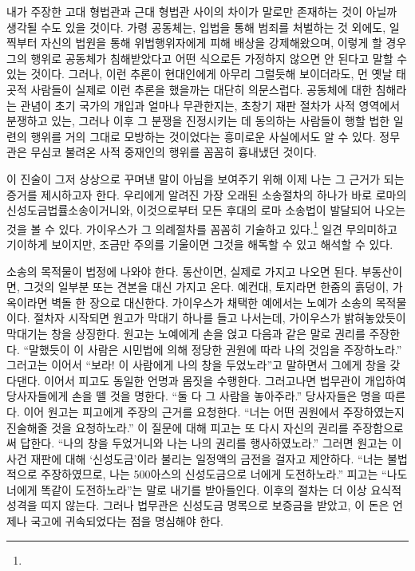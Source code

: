 내가 주장한 고대 형법관과 근대 형법관 사이의 차이가
말로만 존재하는 것이 아닐까 생각될 수도 있을 것이다.
가령 공동체는,
입법을 통해 범죄를 처벌하는 것 외에도,
일찍부터
자신의 법원을 통해
위법행위자에게 피해 배상을
강제해왔으며,
이렇게 할 경우
그의 행위로 공동체가 침해받았다고
어떤 식으로든
가정하지 않으면 안 된다고
말할 수 있는 것이다.
그러나,
이런 추론이
현대인에게
아무리 그럴듯해 보이더라도,
먼 옛날 태곳적 사람들이
실제로
이런 추론을
했을까는 대단히 의문스럽다.
공동체에 대한 침해라는 관념이
초기 국가의 개입과
얼마나 무관한지는,
초창기 재판 절차가
사적 영역에서 분쟁하고 있는,
그러나 이후 그 분쟁을 진정시키는 데 동의하는
사람들이 행할 법한
일련의 행위를 거의 그대로 모방하는 것이었다는
흥미로운 사실에서도
알 수 있다.
정무관은 무심코 불려온 사적 중재인의 행위를 꼼꼼히 흉내냈던 것이다.

이 진술이 그저 상상으로 꾸며낸 말이 아님을 보여주기 위해
이제 나는 그 근거가 되는 증거를 제시하고자 한다.
우리에게 알려진 가장 오래된 소송절차의 하나가
바로 로마의
신성도금법률소송이거니와,
이것으로부터 모든 후대의 로마 소송법이 발달되어 나오는 것을 볼 수 있다.
가이우스가 그 의례절차를 꼼꼼히 기술하고 있다.\footnote{%
   }
일견 무의미하고 기이하게 보이지만,
조금만 주의를 기울이면 그것을 해독할 수 있고 해석할 수 있다.

소송의 목적물이 법정에 나와야 한다.
동산이면, 실제로 가지고 나오면 된다.
부동산이면, 그것의 일부분 또는 견본을 대신 가지고 온다.
예컨대, 토지라면 한줌의 흙덩이, 가옥이라면 벽돌 한 장으로 대신한다.
가이우스가 채택한 예에서는 노예가 소송의 목적물이다.
절차자 시작되면 원고가 막대기 하나를 들고 나서는데,
가이우스가 밝혀놓았듯이 막대기는 창을 상징한다.
원고는 노예에게 손을 얹고 다음과 같은 말로 권리를 주장한다.
``말했듯이
이 사람은 시민법에 의해 정당한 권원에 따라 나의 것임을
주장하노라.''
그러고는 이어서 ``보라! 이 사람에게 나의 창을
두었노라''고 말하면서
그에게 창을 갖다댄다.
이어서 피고도 동일한 언명과 몸짓을 수행한다.
그러고나면 법무관이 개입하여
당사자들에게 손을 뗄 것을 명한다.
``둘 다 그 사람을 놓아주라.''
당사자들은 명을 따른다.
이어 원고는 피고에게 주장의 근거를 요청한다.
``너는 어떤 권원에서 주장하였는지 진술해줄 것을
요청하노라.''
이 질문에 대해 피고는 또 다시 자신의 권리를 주장함으로써 답한다.
``나의 창을 두었거니와 나는 나의 권리를 행사하였노라.''
그러면 원고는 이 사건 재판에 대해
`신성도금'이라 불리는 일정액의 금전을 걸자고 제안하다.
``너는 불법적으로 주장하였므로,
나는 500아스의 신성도금으로 너에게
도전하노라.''
피고는 ``나도 너에게 똑같이 도전하노라''는 말로
내기를 받아들인다.
이후의 절차는 더 이상 요식적 성격을 띠지 않는다.
그러나 법무관은 신성도금 명목으로 보증금을 받았고,
이 돈은 언제나 국고에 귀속되었다는 점을 명심해야 한다.

